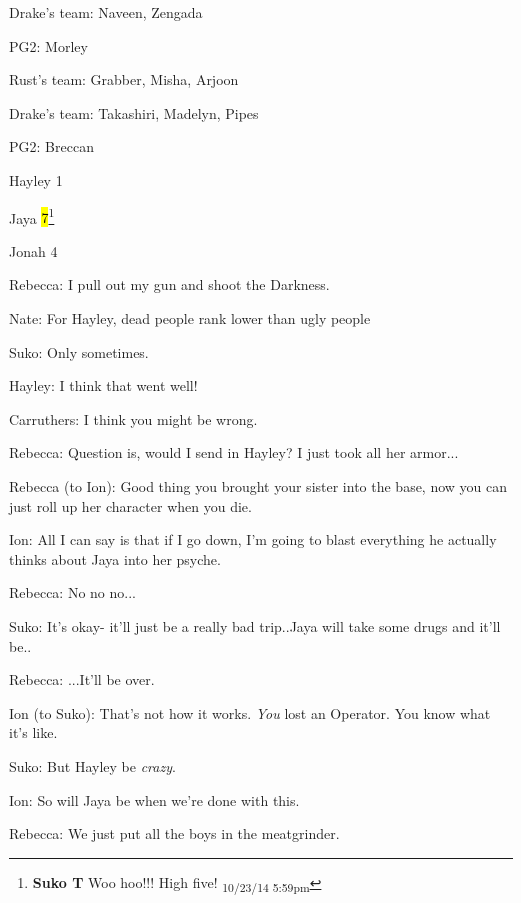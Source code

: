 Drake's team: Naveen, Zengada

PG2: Morley



Rust's team: Grabber, Misha, Arjoon

Drake's team: Takashiri, Madelyn, Pipes 

PG2: Breccan



Hayley 1

Jaya \hl{7}\footnote{\textbf{Suko T }Woo hoo!!!  High five! \textsubscript{10/23/14 5:59pm}}

Jonah 4



Rebecca: I pull out my gun and shoot the Darkness.



Nate: For Hayley, dead people rank lower than ugly people

Suko: Only sometimes.



Hayley: I think that went well!

Carruthers: I think you might be wrong.



Rebecca: Question is, would I send in Hayley?  I just took all her armor...



Rebecca (to Ion): Good thing you brought your sister into the base, now you can just roll up her character when you die.

Ion: All I can say is that if I go down, I'm going to blast everything he actually thinks about Jaya into her psyche.

Rebecca: No no no...

Suko: It's okay- it'll just be a really bad trip..Jaya will take some drugs and it'll be..

Rebecca: ...It'll be over.

Ion (to Suko): That's not how it works.  \textit{You} lost an Operator.  You know what it's like.

Suko: But Hayley be \textit{crazy}.

Ion: So will Jaya be when we're done with this. 



Rebecca: We just put all the boys in the meatgrinder.






\iffalse

